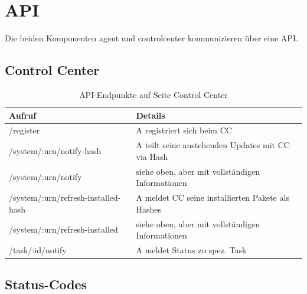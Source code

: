 \section{API}

Die beiden Komponenten \gls{agent} und \gls{controlcenter} kommunizieren über eine API.

\subsection{Control Center}

\begin{table}[]
\centering
\caption{API-Endpunkte auf Seite Control Center}
\label{api:endpoints}
\begin{tabular}{ll}
\hline
\textbf{Aufruf}                     & \textbf{Details}                                  \\ \hline
/register                           & A registriert sich beim CC                        \\
/system/:urn/notify-hash            & A teilt seine anstehenden Updates mit CC via Hash \\
/system/:urn/notify                 & siehe oben, aber mit vollständigen Informationen  \\
/system/:urn/refresh-installed-hash & A meldet CC seine installierten Pakete als Hashes \\
/system/:urn/refresh-installed      & siehe oben, aber mit vollständigen Informationen  \\
/task/:id/notify                    & A meldet Status zu spez. Task                     \\ \hline
\end{tabular}
\end{table}

\subsection{Status-Codes}

